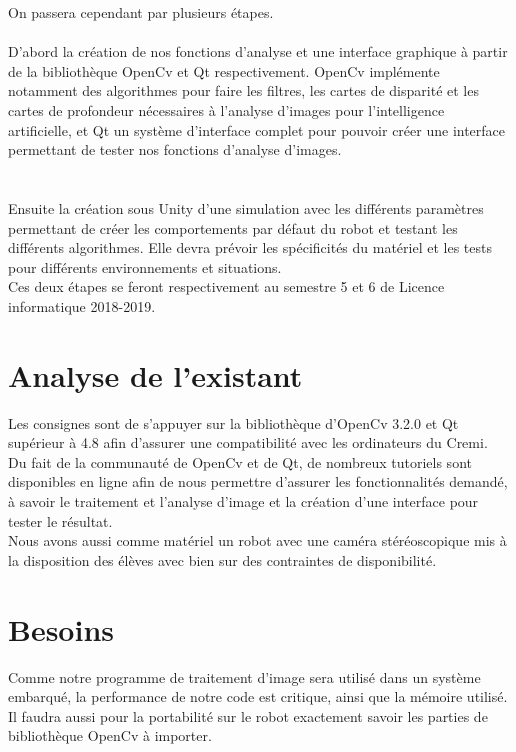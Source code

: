 \documentclass{article}
\begin{document}
	On passera cependant par plusieurs étapes.
	\\\\
	D'abord la création de nos fonctions d'analyse et une interface graphique à partir de la bibliothèque OpenCv et Qt respectivement. OpenCv implémente notamment des algorithmes pour faire les filtres, les cartes de disparité et les cartes de profondeur nécessaires à l'analyse d'images pour l'intelligence artificielle, et Qt un système d'interface complet pour pouvoir créer une interface permettant de tester nos fonctions d'analyse d'images.\\
\\\\
	Ensuite la création sous Unity d'une simulation avec les différents paramètres permettant de créer les comportements par défaut du robot et testant les différents algorithmes. Elle devra prévoir les spécificités du matériel et les tests pour différents environnements et situations.\\
	
	Ces deux étapes se feront respectivement au semestre 5 et 6 de Licence informatique 2018-2019.\\
	
\newpage
\section{Analyse de l’existant}

Les consignes sont de s'appuyer sur la bibliothèque d'OpenCv 3.2.0
et Qt supérieur à 4.8 afin d'assurer une compatibilité avec les ordinateurs du Cremi. \\
Du fait de la communauté de OpenCv et de Qt, de nombreux tutoriels sont disponibles en ligne afin de nous permettre d'assurer les fonctionnalités demandé, à savoir le traitement et l'analyse d'image et la création d'une interface pour tester le résultat.\\

Nous avons aussi comme matériel un robot avec une caméra stéréoscopique mis à la disposition des élèves avec bien sur des contraintes de disponibilité.


\section{Besoins}

Comme notre programme de traitement d'image sera utilisé dans un système embarqué, la performance de notre code est critique, ainsi que la mémoire utilisé.\\
Il faudra aussi pour la portabilité sur le robot exactement savoir les parties de bibliothèque OpenCv à importer.\\
\end{document}
